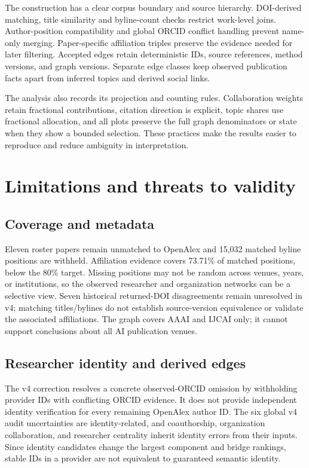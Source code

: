 The construction has a clear corpus boundary and source hierarchy. DOI-derived
matching, title similarity and byline-count checks restrict work-level joins.
Author-position compatibility and global ORCID conflict handling prevent
name-only merging. Paper-specific affiliation triples preserve the evidence
needed for later filtering. Accepted edges retain deterministic IDs, source
references, method versions, and graph versions. Separate edge classes keep
observed publication facts apart from inferred topics and derived social links.

The analysis also records its projection and counting rules. Collaboration
weights retain fractional contributions, citation direction is explicit, topic
shares use fractional allocation, and all plots preserve the full graph
denominators or state when they show a bounded selection. These practices make
the results easier to reproduce and reduce ambiguity in interpretation.

\section{Limitations and threats to validity}

\subsection{Coverage and metadata}

Eleven roster papers remain unmatched to OpenAlex and 15,032 matched byline
positions are withheld. Affiliation evidence covers 73.71\% of matched
positions, below the 80\% target. Missing positions may not be random across
venues, years, or institutions, so the observed researcher and organization
networks can be a selective view. Seven historical returned-DOI disagreements
remain unresolved in v4; matching titles/bylines do not establish source-version
equivalence or validate the associated affiliations. The graph covers AAAI and IJCAI only; it cannot
support conclusions about all AI publication venues.

\subsection{Researcher identity and derived edges}

The v4 correction resolves a concrete observed-ORCID omission by withholding
provider IDs with conflicting ORCID evidence. It does not provide independent
identity verification for every remaining OpenAlex author ID. The six global
v4 audit uncertainties are identity-related, and coauthorship, organization
collaboration, and researcher centrality inherit identity errors from their
inputs. Since identity candidates change the largest component and bridge
rankings, stable IDs in a provider are not equivalent to guaranteed semantic
identity.

